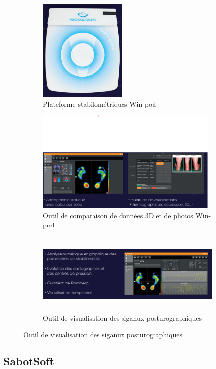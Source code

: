  \begin{figure}[H]
    \centering
    \begin{subfigure}[b]{0.45\textwidth}
      \centering
        \includegraphics[height=5cm]{images/analyse_marche/WinPod.png}
        \caption{Plateforme stabilométriques Win-pod}\label{fig:WinPod}
    \end{subfigure}
    \begin{subfigure}[b]{0.5\textwidth}
        \centering
        \includegraphics[height=5cm]{images/analyse_marche/WinPod1.png}
        \caption{Outil de comparaison de données 3D et de photos Win-pod }\label{fig:WinPod1}
    \end{subfigure} 
    \begin{subfigure}[b]{0.5\textwidth}
        \hspace{-2.5cm} 
        \includegraphics[height=4cm]{images/analyse_marche/WinPod2.png}
        \caption{Outil de visualisation des siganux posturographiques}\label{fig:WinPod2}
    \end{subfigure}
\end{figure}

\subsection{SabotSoft}

